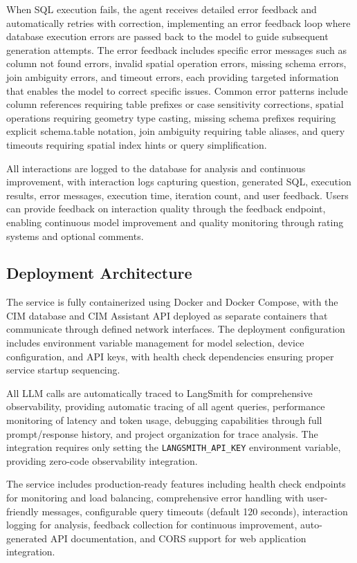 When SQL execution fails, the agent receives detailed error feedback and automatically retries with correction, implementing an error feedback loop where database execution errors are passed back to the model to guide subsequent generation attempts. The error feedback includes specific error messages such as column not found errors, invalid spatial operation errors, missing schema errors, join ambiguity errors, and timeout errors, each providing targeted information that enables the model to correct specific issues. Common error patterns include column references requiring table prefixes or case sensitivity corrections, spatial operations requiring geometry type casting, missing schema prefixes requiring explicit schema.table notation, join ambiguity requiring table aliases, and query timeouts requiring spatial index hints or query simplification.

All interactions are logged to the database for analysis and continuous improvement, with interaction logs capturing question, generated SQL, execution results, error messages, execution time, iteration count, and user feedback. Users can provide feedback on interaction quality through the feedback endpoint, enabling continuous model improvement and quality monitoring through rating systems and optional comments.

\subsection{Deployment Architecture}

The service is fully containerized using Docker and Docker Compose, with the CIM database and CIM Assistant API deployed as separate containers that communicate through defined network interfaces. The deployment configuration includes environment variable management for model selection, device configuration, and API keys, with health check dependencies ensuring proper service startup sequencing.

All LLM calls are automatically traced to LangSmith for comprehensive observability, providing automatic tracing of all agent queries, performance monitoring of latency and token usage, debugging capabilities through full prompt/response history, and project organization for trace analysis. The integration requires only setting the \texttt{LANGSMITH\_API\_KEY} environment variable, providing zero-code observability integration.

The service includes production-ready features including health check endpoints for monitoring and load balancing, comprehensive error handling with user-friendly messages, configurable query timeouts (default 120 seconds), interaction logging for analysis, feedback collection for continuous improvement, auto-generated API documentation, and CORS support for web application integration.

